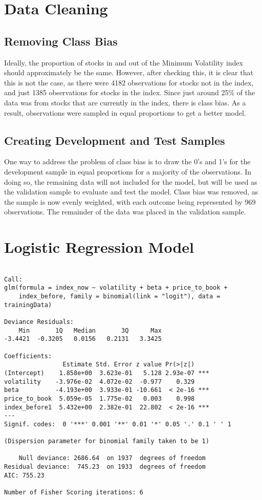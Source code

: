\documentclass[12pt,twoside]{reedthesis}
\theoremstyle{definition}
\theoremstyle{definition}
\theoremstyle{definition}
\theoremstyle{remark}
\begin{document}
\section{Data Cleaning}\label{data-cleaning-1}

\subsection{Removing Class Bias}\label{removing-class-bias}

Ideally, the proportion of stocks in and out of the Minimum Volatility
index should approximately be the same. However, after checking this, it
is clear that this is not the case, as there were 4182 observations for
stocks not in the index, and just 1385 observations for stocks in the
index. Since just around 25\% of the data was from stocks that are
currently in the index, there is class bias. As a result, observations
were sampled in equal proportions to get a better model.

\subsection{Creating Development and Test
Samples}\label{creating-development-and-test-samples}

One way to address the problem of class bias is to draw the 0's and 1's
for the development sample in equal proportions for a majority of the
observations. In doing so, the remaining data will not included for the
model, but will be used as the validation sample to evaluate and test
the model. Class bias was removed, as the sample is now evenly weighted,
with each outcome being represented by 969 observations. The remainder
of the data was placed in the validation sample.

\section{Logistic Regression Model}\label{logistic-regression-model-1}
\begin{verbatim}

Call:
glm(formula = index_now ~ volatility + beta + price_to_book + 
    index_before, family = binomial(link = "logit"), data = trainingData)

Deviance Residuals: 
    Min       1Q   Median       3Q      Max  
-3.4421  -0.3205   0.0156   0.2131   3.3425  

Coefficients:
                Estimate Std. Error z value Pr(>|z|)    
(Intercept)    1.858e+00  3.623e-01   5.128 2.93e-07 ***
volatility    -3.976e-02  4.072e-02  -0.977    0.329    
beta          -4.193e+00  3.933e-01 -10.661  < 2e-16 ***
price_to_book  5.059e-05  1.775e-02   0.003    0.998    
index_before1  5.432e+00  2.382e-01  22.802  < 2e-16 ***
---
Signif. codes:  0 '***' 0.001 '**' 0.01 '*' 0.05 '.' 0.1 ' ' 1

(Dispersion parameter for binomial family taken to be 1)

    Null deviance: 2686.64  on 1937  degrees of freedom
Residual deviance:  745.23  on 1933  degrees of freedom
AIC: 755.23

Number of Fisher Scoring iterations: 6
\end{verbatim}
\end{document}
